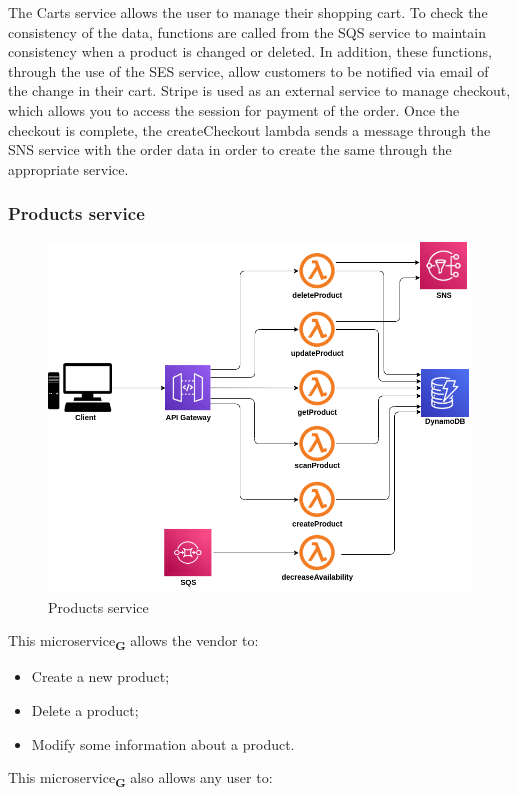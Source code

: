 The Carts service allows the user to manage their shopping cart.
To check the consistency of the data, functions are called from the SQS service to maintain consistency when a product is changed or deleted.
In addition, these functions, through the use of the SES service, allow customers to be notified via email of the change in their cart.
Stripe is used as an external service to manage checkout, which allows you to access the session for payment of the order. Once the checkout is complete, the createCheckout lambda sends a message through the SNS service with the order data in order to create the same through the appropriate service.
\pagebreak
\subsubsection{Products service}
\begin{figure}[!h]
    \vspace{5px}
    \includegraphics[scale=0.5]{../../../../Images/Diagrammi/maintainerManual/productService.png}
    \centering
    \caption{Products service}
\end{figure}
This microservice\textsubscript{\textbf{G}} allows the vendor to:
\begin{itemize}
    \item Create a new product;
    \item Delete a product;
    \item Modify some information about a product.
\end{itemize}
This microservice\textsubscript{\textbf{G}} also allows any user to:
